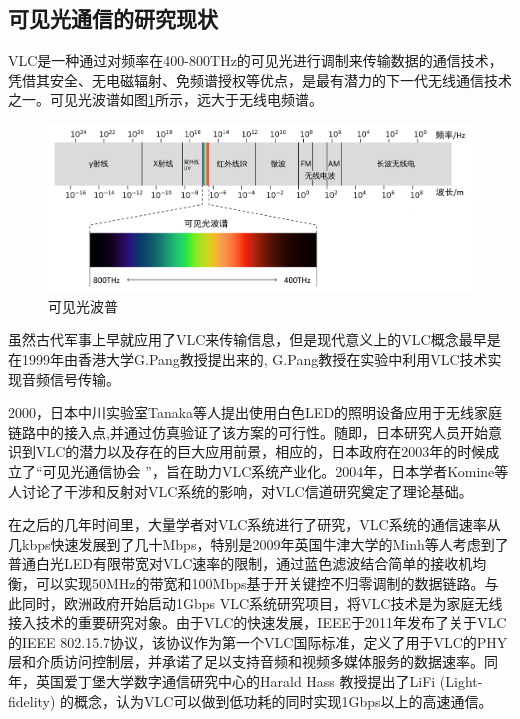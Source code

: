 \subsection{可见光通信的研究现状}
VLC是一种通过对频率在400-800THz的可见光进行调制来传输数据的通信技术，凭借其安全、无电磁辐射、免频谱授权等优点，是最有潜力的下一代无线通信技术之一\cite{vlc-sejan2023comprehensive}。可见光波谱如图\ref{fig:spectrum}所示，远大于无线电频谱。
\begin{figure}[!htbp]
  \centering
  \includegraphics[width=\linewidth]{FIG/Eletornic spectrum.pdf}
  \caption{可见光波普}
  \label{fig:spectrum}
\end{figure}


虽然古代军事上早就应用了VLC来传输信息，但是现代意义上的VLC概念最早是在1999年由香港大学G.Pang教授提出来的\cite{1211-vlc1999}, G.Pang教授在实验中利用VLC技术实现音频信号传输。

2000，日本中川实验室Tanaka等人提出使用白色LED的照明设备应用于无线家庭链路中的接入点,并通过仿真验证了该方案的可行性\cite{1212-vlc2000}。随即，日本研究人员开始意识到VLC的潜力以及存在的巨大应用前景，相应的，日本政府在2003年的时候成立了“可见光通信协会 ”，旨在助力VLC系统产业化。2004年，日本学者Komine等人讨论了干涉和反射对VLC系统的影响，对VLC信道研究奠定了理论基础\cite{1213-vlc2004}。

在之后的几年时间里，大量学者对VLC系统进行了研究，VLC系统的通信速率从几kbps快速发展到了几十Mbps，特别是2009年英国牛津大学的Minh等人考虑到了普通白光LED有限带宽对VLC速率的限制，通过蓝色滤波结合简单的接收机均衡，可以实现50MHz的带宽和100Mbps基于开关键控不归零调制的数据链路\cite{1214-vlc2009}。与此同时，欧洲政府开始启动1Gbps VLC系统研究项目，将VLC技术是为家庭无线接入技术的重要研究对象。由于VLC的快速发展，IEEE于2011年发布了关于VLC的IEEE 802.15.7协议，该协议作为第一个VLC国际标准，定义了用于VLC的PHY层和介质访问控制层，并承诺了足以支持音频和视频多媒体服务的数据速率。同年，英国爱丁堡大学数字通信研究中心的Harald Hass 教授提出了LiFi (Light-fidelity) 的概念，认为VLC可以做到低功耗的同时实现1Gbps以上的高速通信\cite{1215-vlc2011}。

